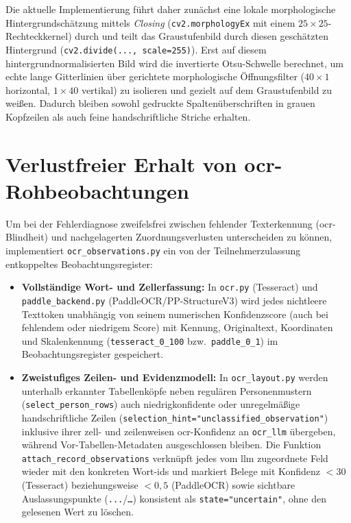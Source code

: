 Die aktuelle Implementierung führt daher zunächst eine lokale morphologische Hintergrundschätzung mittels \emph{Closing} (\texttt{cv2.morphologyEx} mit einem $25 \times 25$-Rechteckkernel) durch und teilt das Graustufenbild durch diesen geschätzten Hintergrund (\texttt{cv2.divide(..., scale=255)}). Erst auf diesem hintergrundnormalisierten Bild wird die invertierte Otsu-Schwelle berechnet, um echte lange Gitterlinien über gerichtete morphologische Öffnungsfilter ($40 \times 1$ horizontal, $1 \times 40$ vertikal) zu isolieren und gezielt auf dem Graustufenbild zu weißen. Dadurch bleiben sowohl gedruckte Spaltenüberschriften in grauen Kopfzeilen als auch feine handschriftliche Striche erhalten.

\section{Verlustfreier Erhalt von \texorpdfstring{\ac{ocr}}{OCR}-Rohbeobachtungen}
\label{sec:umsetzung-beobachtungen}

Um bei der Fehlerdiagnose zweifelsfrei zwischen fehlender Texterkennung (\ac{ocr}-Blindheit) und nachgelagerten Zuordnungsverlusten unterscheiden zu können, implementiert \texttt{ocr\_observations.py} ein von der Teilnehmerzulassung entkoppeltes Beobachtungsregister:
\begin{itemize}
  \item \textbf{Vollständige Wort- und Zellerfassung:} In \texttt{ocr.py} (Tesseract) und \texttt{paddle\_backend.py} (PaddleOCR/PP-StructureV3) wird jedes nichtleere Texttoken unabhängig von seinem numerischen Konfidenzscore (auch bei fehlendem oder niedrigem Score) mit Kennung, Originaltext, Koordinaten und Skalenkennung (\texttt{tesseract\_0\_100} bzw.\ \texttt{paddle\_0\_1}) im Beobachtungsregister gespeichert.
  \item \textbf{Zweistufiges Zeilen- und Evidenzmodell:} In \texttt{ocr\_layout.py} werden unterhalb erkannter Tabellenköpfe neben regulären Personenmustern (\texttt{select\_person\_rows}) auch niedrigkonfidente oder unregelmäßige handschriftliche Zeilen (\texttt{selection\_hint="unclassified\_observation"}) inklusive ihrer zell- und zeilenweisen \ac{ocr}-Konfidenz an \texttt{ocr\_llm} übergeben, während Vor-Tabellen-Metadaten ausgeschlossen bleiben. Die Funktion \texttt{attach\_record\_observations} verknüpft jedes vom \ac{llm} zugeordnete Feld wieder mit den konkreten Wort-\acp{id} und markiert Belege mit Konfidenz $< 30$ (Tesseract) beziehungsweise $< 0{,}5$ (PaddleOCR) sowie sichtbare Auslassungspunkte (\texttt{...}/\texttt{…}) konsistent als \texttt{state="uncertain"}, ohne den gelesenen Wert zu löschen.
\end{itemize}

